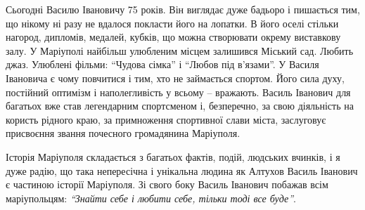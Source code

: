 
Сьогодні Василю Івановичу 75 років. Він виглядає дуже бадьоро і пишається тим,
що нікому ні разу не вдалося покласти його на лопатки. В його оселі стільки
нагород, дипломів, медалей, кубків, що можна створювати окрему виставкову залу.
У Маріуполі найбільш улюбленим місцем залишився Міський сад. Любить джаз.
Улюблені фільми: \enquote{Чудова сімка} і \enquote{Любов під в'язами}. У Василя Івановича є
чому повчитися і тим, хто не займається спортом. Його сила духу, постійний
оптимізм і наполегливість у всьому – вражають. Василь Іванович для багатьох вже
став легендарним спортсменом і, безперечно, за свою діяльність на користь
рідного краю, за примноження спортивної слави міста, заслуговує присвоєння
звання почесного громадянина Маріуполя.

Історія Маріуполя складається з багатьох фактів, подій, людських вчинків, і я
дуже радію, що така непересічна і унікальна людина як Алтухов Василь Іванович є
частиною історії Маріуполя. Зі свого боку Василь Іванович побажав всім
маріупольцям: \emph{\enquote{Знайти себе і любити себе, тільки тоді все буде}}.

\clearpage
